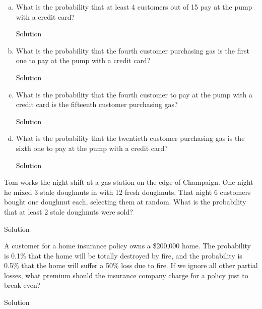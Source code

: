 \documentclass{article}
\begin{document}
\begin{spacing}{1.1}
\begin{homeworkProblem}
\begin{enumerate}[(a)]
\begin{homeworkSection}{Solution}
			\end{homeworkSection}
		\item  What is the probability that at least 4 customers out of 15 pay at the pump with a credit card?
			\begin{homeworkSection}{Solution}
		
			\end{homeworkSection}
		\item What is the probability that the fourth customer purchasing gas is the first one to pay at the pump with a credit card?
			\begin{homeworkSection}{Solution}
		
			\end{homeworkSection}
		\item What is the probability that the fourth customer to pay at the pump with a credit card is the fifteenth customer purchasing gas?
			\begin{homeworkSection}{Solution}
		
			\end{homeworkSection}	
		\item What is the probability that the twentieth customer purchasing gas is the sixth one to pay at the pump with a credit card?		
			\begin{homeworkSection}{Solution}
		
			\end{homeworkSection}	
	\end{enumerate}
\end{homeworkProblem}
\begin{homeworkProblem}
	Tom works the night shift at a gas station on the edge of Champaign. One night he mixed 3 stale doughnuts in with 12 fresh doughnuts. That night 6 customers bought one doughnut each, selecting them at random. What is the probability that at least 2 stale doughnuts were sold?
	\begin{homeworkSection}{Solution}
		
	\end{homeworkSection}
\end{homeworkProblem}
\begin{homeworkProblem}
	A customer for a home insurance policy owns a \$200,000 home. The probability is 0.1\% that the home will be totally destroyed by fire, and the probability is 0.5\% that
the home will suffer a 50\% loss due to fire. If we ignore all other partial losses, what premium should the insurance company charge for a policy just to break even?
	\begin{homeworkSection}{Solution}
		

\end{homeworkSection}
\end{homeworkProblem}
\end{spacing}
\end{document}
